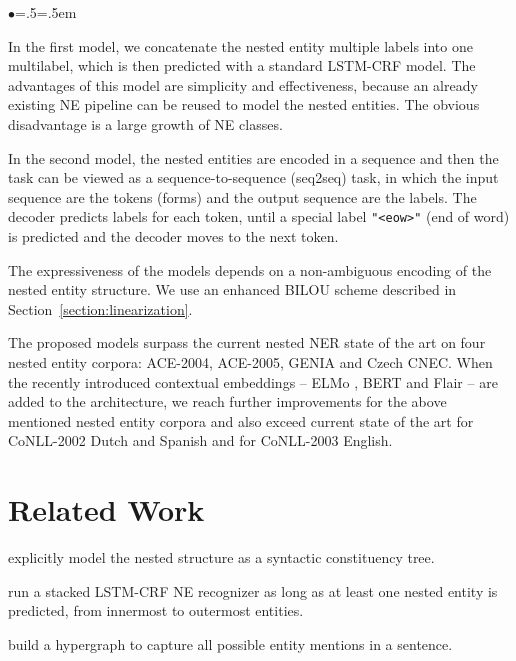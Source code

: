 \documentclass[11pt,a4paper]{article}
\newenvironment{citemize}{\begin{list}{$\bullet$}{\topsep=.5\smallskipamount\itemsep=0pt\parsep=1pt\labelwidth=.5em}}{\end{list}}
\begin{document}
\begin{citemize}
  \item In the first model, we concatenate the nested entity multiple labels
    into one multilabel, which is then predicted with a standard LSTM-CRF
    \cite{Lample2016} model. The advantages of this model are simplicity and
    effectiveness, because an already existing NE pipeline can be reused to
    model the nested entities. The obvious disadvantage is a large growth of NE
    classes.
  \item In the second model, the nested entities are encoded in a sequence and
    then the task can be viewed as a sequence-to-sequence (seq2seq) task, in
    which the input sequence are the  tokens (forms) and the output sequence
    are the labels. The decoder predicts labels for each token, until a special
    label \texttt{"<eow>"} (end of word) is predicted and the decoder moves to
    the next token.
\end{citemize}

The expressiveness of the models depends on a non-ambiguous encoding of the
nested entity structure. We use an enhanced BILOU scheme described in
Section~\ref{section:linearization}.

The proposed models surpass the current nested NER state of the art on four
nested entity corpora: ACE-2004, ACE-2005, GENIA and Czech CNEC. When the
recently introduced contextual embeddings -- ELMo \cite{Peters2018}, BERT
\cite{BERT} and Flair \cite{Akbik} -- are added to the architecture, we reach
further improvements for the above mentioned nested entity corpora and also
exceed current state of the art for CoNLL-2002 Dutch and Spanish and for
CoNLL-2003 English.




\section{Related Work}
\label{section:related_work}

\citet{Finkel2009} explicitly model the nested structure as a syntactic
constituency tree.

\citet{Ju2018} run a stacked LSTM-CRF NE recognizer as long as at least one
nested entity is predicted, from innermost to outermost entities.





\citet{Wang2018} build a hypergraph to capture all possible entity mentions in
a sentence.
\end{document}

